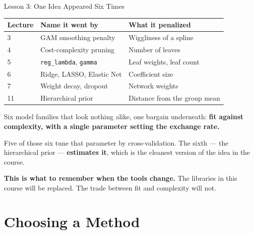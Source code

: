 \documentclass[aspectratio=169, 11pt]{beamer}
\begin{document}
\begin{frame}{Lesson 3: One Idea Appeared Six Times}
  \begin{center}
    {\small
    \begin{tabular}{p{2.0cm}p{4.0cm}p{6.3cm}}
      \toprule
      \textbf{Lecture} & \textbf{Name it went by} & \textbf{What it penalized} \\
      \midrule
      3 & GAM smoothing penalty & Wiggliness of a spline \\
      4 & Cost-complexity pruning & Number of leaves \\
      5 & \texttt{reg\_lambda}, \texttt{gamma} & Leaf weights, leaf count \\
      6 & Ridge, LASSO, Elastic Net & Coefficient size \\
      7 & Weight decay, dropout & Network weights \\
      11 & Hierarchical prior & Distance from the group mean \\
      \bottomrule
    \end{tabular}
    }
  \end{center}

  \vspace{0.05cm}
  Six model families that look nothing alike, one bargain underneath: \textbf{fit against
  complexity, with a single parameter setting the exchange rate.}

  \vspace{0.15cm}
  Five of those six tune that parameter by cross-validation. The sixth --- the hierarchical prior
  --- \textbf{estimates it}, which is the cleanest version of the idea in the course.

  \vspace{0.1cm}
  \textbf{This is what to remember when the tools change.} The libraries in this course will be
  replaced. The trade between fit and complexity will not.
\end{frame}

\section{Choosing a Method}

\end{document}
